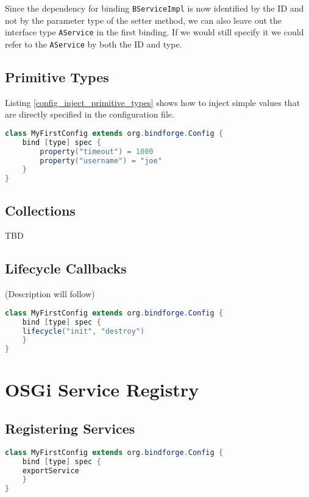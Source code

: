 Since the dependency for binding \verb!BServiceImpl! is now identified by the ID and not by the parameter type of the setter method, we can also leave out the interface type \verb!AService! in the first binding. If we would still specify it we could refer to the \verb!AService! by both the ID and type.

\subsection{Primitive Types}

Listing \ref{config_inject_primitive_types} shows how to inject simple values that are directly specified in the configuration file.

\begin{lstlisting}[caption={Inject primitive types},label=config_inject_primitive_types,language=Java]
class MyFirstConfig extends org.bindforge.Config {
    bind [type] spec {
        property("timeout") = 1000
        property("username") = "joe"
    }
}
\end{lstlisting}

\subsection{Collections}

TBD

\subsection{Lifecycle Callbacks}

(Description will follow)

\begin{lstlisting}[caption={Lifecycle callbacks},label=lifecycle_callbacks,language=Java]
class MyFirstConfig extends org.bindforge.Config {
    bind [type] spec {
	lifecycle("init", "destroy")
    }
}
\end{lstlisting}


\section{OSGi Service Registry}

\subsection{Registering Services}

\begin{lstlisting}[caption={Registering OSGi services},label=registering_osgi_services,language=Java]
class MyFirstConfig extends org.bindforge.Config {
    bind [type] spec {
	exportService
    }
}
\end{lstlisting}

